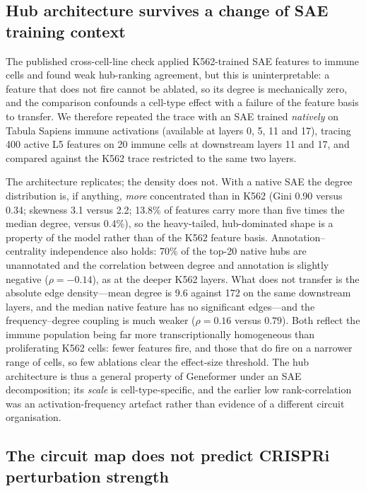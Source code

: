 \documentclass[11pt,onecolumn]{article}
\begin{document}
\subsection{Hub architecture survives a change of SAE training context}

The published cross-cell-line check applied K562-trained SAE features to immune cells and found weak hub-ranking agreement, but this is uninterpretable: a feature that does not fire cannot be ablated, so its degree is mechanically zero, and the comparison confounds a cell-type effect with a failure of the feature basis to transfer. We therefore repeated the trace with an SAE trained \emph{natively} on Tabula Sapiens immune activations (available at layers 0, 5, 11 and 17), tracing 400 active L5 features on 20 immune cells at downstream layers 11 and 17, and compared against the K562 trace restricted to the same two layers.

The architecture replicates; the density does not. With a native SAE the degree distribution is, if anything, \emph{more} concentrated than in K562 (Gini 0.90 versus 0.34; skewness 3.1 versus 2.2; 13.8\% of features carry more than five times the median degree, versus 0.4\%), so the heavy-tailed, hub-dominated shape is a property of the model rather than of the K562 feature basis. Annotation--centrality independence also holds: 70\% of the top-20 native hubs are unannotated and the correlation between degree and annotation is slightly negative ($\rho=-0.14$), as at the deeper K562 layers. What does not transfer is the absolute edge density---mean degree is 9.6 against 172 on the same downstream layers, and the median native feature has no significant edges---and the frequency--degree coupling is much weaker ($\rho=0.16$ versus $0.79$). Both reflect the immune population being far more transcriptionally homogeneous than proliferating K562 cells: fewer features fire, and those that do fire on a narrower range of cells, so few ablations clear the effect-size threshold. The hub architecture is thus a general property of Geneformer under an SAE decomposition; its \emph{scale} is cell-type-specific, and the earlier low rank-correlation was an activation-frequency artefact rather than evidence of a different circuit organisation.

\subsection{The circuit map does not predict CRISPRi perturbation strength}
\end{document}
